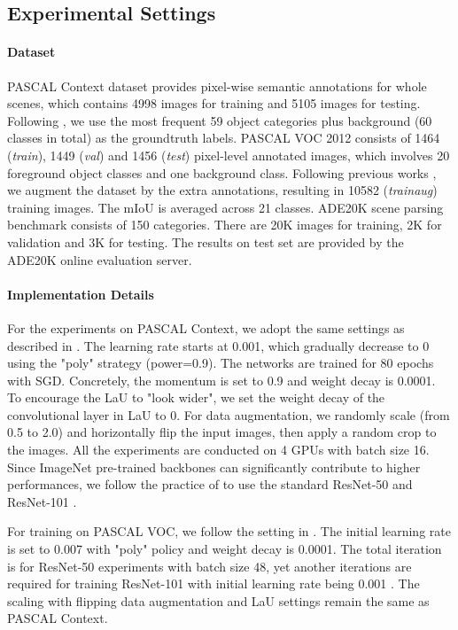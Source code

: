 \documentclass[10pt,twocolumn,letterpaper]{article}
\begin{document}
\subsection{Experimental Settings}
\paragraph{Dataset} PASCAL Context dataset \cite{MottaghiCLCLFUY14} provides pixel-wise semantic annotations for whole scenes, which contains 4998 images for training and 5105 images for testing. Following \cite{LinMSR17, DANet, JPU, EncNet}, we use the most frequent 59 object categories plus background (60 classes in total) as the groundtruth labels. PASCAL VOC 2012 consists of 1464 (\textit{train}), 1449 (\textit{val}) and 1456 (\textit{test}) pixel-level annotated images, which involves 20 foreground object classes and one background class. Following previous works \cite{deeplabv3, HariharanABMM11}, we augment the dataset by the extra annotations, resulting in 10582 (\textit{trainaug}) training images. The mIoU is averaged across 21 classes. ADE20K \cite{ADE20K} scene parsing benchmark consists of 150 categories. There are 20K images for training, 2K for validation and 3K for testing. The results on test set are provided by the ADE20K online evaluation server.

\paragraph{Implementation Details}
For the experiments on PASCAL Context, we adopt the same settings as described in \cite{EncNet, JPU}. The learning rate starts at 0.001, which gradually decrease to 0 using the "poly" strategy (power=0.9). The networks are trained for 80 epochs with SGD. Concretely, the momentum is set to 0.9 and weight decay is 0.0001. To encourage the LaU to "look wider", we set the weight decay of the convolutional layer in LaU to 0. For data augmentation, we randomly scale (from 0.5 to 2.0)  and horizontally flip the input images, then apply a  random crop to the images. All the experiments are conducted on 4 GPUs with batch size 16. Since ImageNet pre-trained backbones can significantly contribute to higher performances, we follow the practice of \cite{EncNet, JPU, DANet, DUpsampling} to use the standard ResNet-50 and ResNet-101 \cite{resnet}. 

For training on PASCAL VOC, we follow the setting in \cite{DUpsampling, deeplabv3}. The initial learning rate is set to 0.007 with "poly" policy and weight decay is 0.0001. The total iteration is  for ResNet-50 experiments with batch size 48, yet another  iterations are required for training ResNet-101 with initial learning rate being 0.001 \cite{deeplabv3}. The scaling with flipping data augmentation and LaU settings remain the same as PASCAL Context. 
\end{document}
